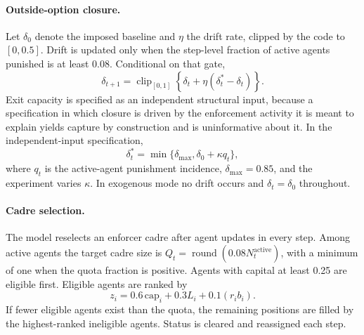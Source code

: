 \documentclass[12pt]{article}
\begin{document}
\paragraph{Outside-option closure.} Let \(\delta_0\) denote the imposed baseline
and \(\eta\) the drift rate, clipped by the code to \([0,0.5]\). Drift is updated
only when the step-level fraction of active agents punished is at least 0.08.
Conditional on that gate,
\begin{equation}
 \delta_{t+1}=\operatorname{clip}_{[0,1]}\left\{\delta_t+\eta(\delta_t^{*}-\delta_t)\right\}.
\end{equation}
Exit capacity is specified as an independent structural input, because a
specification in which closure is driven by the enforcement activity it is meant
to explain yields capture by construction and is uninformative about it. In the
independent-input specification,
\begin{equation}
 \delta_t^{*}=\min\{\delta_{\max},\delta_0+\kappa q_t\},
\end{equation}
where \(q_t\) is the active-agent punishment incidence, \(\delta_{\max}=0.85\),
and the experiment varies \(\kappa\). In exogenous mode no drift occurs and
\(\delta_t=\delta_0\) throughout.

\paragraph{Cadre selection.} The model reselects an enforcer cadre after agent
updates in every step. Among active agents the target cadre size is
\(Q_t=\operatorname{round}(0.08N_t^{\mathrm{active}})\), with a minimum of one
when the quota fraction is positive. Agents with capital at least 0.25 are
eligible first. Eligible agents are ranked by
\begin{equation}
 z_i=0.6\,\mathrm{cap}_i+0.3L_i+0.1(r_ib_i).
\end{equation}
If fewer eligible agents exist than the quota, the remaining positions are
filled by the highest-ranked ineligible agents. Status is cleared and reassigned
each step.
\end{document}
